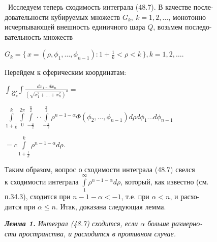﻿\documentclass[twocolumn]{article}
\begin{document}
\ Исследуем теперь сходимость интеграла (48.7). В качестве после-\\довательности кубируемых множеств $G_k,\ k = 1, 2,\ldots$,
монотонно\\ исчерпывающей внешность единичного шара $Q$, возьмем последо-\\вательность множеств
\begin{center}
$G_k = \{\,x = (\rho,\phi_1,\ldots,\phi_{n-1}):1 + \frac1k < \rho < k\,\}, k = 1,2,\ldots$.
\end{center}
\hspace{5pt} Перейдем к сферическим координатам:
\begin{center}
$\int \underset{G_k}{\ldots} \int\frac{dx_1\ldots dx_n}{(\sqrt{x^2_1+\ldots +x^2_n})^a} = $
\end{center}
\begin{center}
$\int\limits^k_{1 + \frac1k}\int\limits_0^{2\pi}\int\limits_{-\frac{\pi}{2}}^{\frac{\pi}{2}}\cdot \cdot \int\limits_{-\frac{\pi}{2}}^{\frac{\pi}{2}}\rho^{n-1-\alpha}\Phi(\phi_2,\ldots,\phi_{n-1})d\rho d\phi_1\ldots d\phi_{n-1}$
\end{center}

\newpage

\begin{center}
$= c \int\limits^k_{1 + \frac1k} \rho^{n-1-\alpha}d\rho$.
\end{center}
\hspace{5pt} Таким образом, вопрос о сходимости интеграла (48.7) свелся\\ к сходимости интеграла $\int\limits_1^{\infty}\rho^{n-1-\alpha}d\rho$, который, как известно (см.\\п.34.3), сходится при $n - 1 - \alpha < -1$, т.е. при $\alpha < n$, и расхо-\\дится при $\alpha\le n$. Итак, доказана следующая лемма.

{\slshape{{\bfseries{Лемма 1.}} Интеграл (48.7) сходится, если $\alpha$ больше размерно-\\сти пространства, и расходится в противном случае.}}
\end{document}
